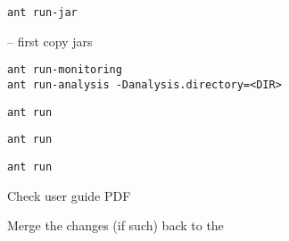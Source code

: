 \begin{compactenum}
\begin{compactenum}
\begin{compactitem}
\item {}
\setBashListing
\begin{lstlisting}
ant run-jar
\end{lstlisting}
\item {} -- first copy jars
\setBashListing
\begin{lstlisting}
ant run-monitoring
ant run-analysis -Danalysis.directory=<DIR>
\end{lstlisting}
\item {}
\setBashListing
\begin{lstlisting}
ant run
\end{lstlisting}
\item {}
\setBashListing
\begin{lstlisting}
ant run
\end{lstlisting}
\item {}
\setBashListing
\begin{lstlisting}
ant run
\end{lstlisting}
\end{compactitem}
\item Check user guide PDF 
\end{compactenum}

\item Merge the changes (if such) back to the 
\end{compactenum}
